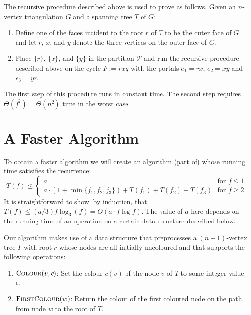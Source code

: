 \documentclass[kpfonts]{patmorin}
\let\le\leqslant
\let\ge\geqslant
\begin{document}
The recursive procedure described above is used to prove  as follows.  Given an $n$-vertex triangulation $G$ and a spanning tree $T$ of $G$:
\begin{enumerate}
  \item Define one of the faces incident to the root $r$ of $T$ to be the outer face of $G$ and let $r$, $x$, and $y$ denote the three vertices on the outer face of $G$.
  \item Place $\{r\}$, $\{x\}$, and $\{y\}$ in the partition $\mathcal{P}$ and run the recursive procedure described above on the cycle $F:=rxy$ with the portals $e_1=rx$, $e_2=xy$ and $e_3=yr$.
\end{enumerate}
The first step of this procedure runs in constant time.  The second step requires $\Theta(f^2)=\Theta(n^2)$ time in the worst case.

\section{A Faster Algorithm}

To obtain a faster algorithm we will create an algorithm (part of) whose running time satisifies the recurrence:
\[  T(f) \le \begin{cases}
         a & \text{for $f\le 1$} \\
         a\cdot(1+\min\{f_1,f_2,f_3\}) + T(f_1)+T(f_2)+T(f_3) & \text{for $f\ge 2$}
       \end{cases}
\]
It is straightforward to show, by induction, that $T(f)\le (a/3)f\log_3(f)=O(a\cdot f\log f)$.  The value of $a$ here depends on the running time of an operation on a certain data structure described below.

Our algorithm makes use of a data structure that preprocesses a $(n+1)$-vertex tree $T$ with root $r$ whose nodes are all initially uncoloured and that supports the following operations:
\begin{enumerate}
   \item $\textsc{Colour}(v,c)$: Set the colour $c(v)$ of the node $v$ of $T$ to some integer value $c$.

   \item $\textsc{FirstColour}(w)$: Return the colour of the first coloured node on the path from node $w$ to the root of $T$.
\end{enumerate}
\end{document}
